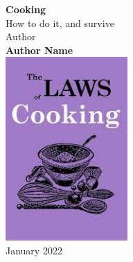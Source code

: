 \documentclass[
	12pt,
	a4paper,
	titlepage,
	oneside]{book}
\begin{document}
%
%
\frontmatter
\begin{titlepage}
\begin{center}
  \vspace*{4cm}
  \Huge{\textbf{Cooking}} \\[15pt]
  \LARGE{How to do it, and survive} \\
  \vspace{1.5cm}
  \large{Author}\\[5pt]
  \Large{\textbf{Author Name}} \\
  \vfill
  \includegraphics[width=0.35\textwidth]{images/title.jpg}\\[5pt]
  \vspace{1cm}
  {January 2022}
\end{center}
\end{titlepage}

\newpage

\tableofcontents
%
%
\mainmatter

  
  \newpage
  

\backmatter
\showindex
\end{document}

